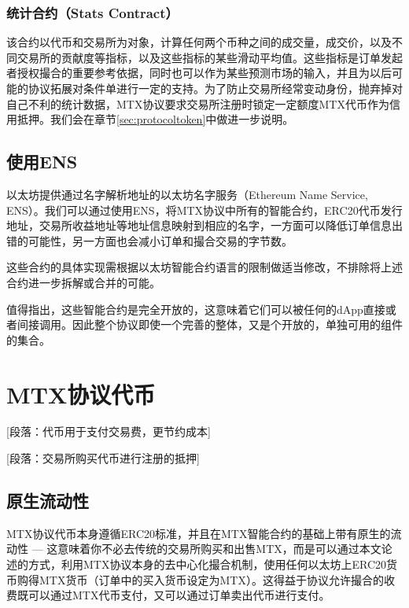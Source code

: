 \documentclass[UTF8,nofonts]{ctexart}
\begin{document}
\subsubsection{统计合约（Stats Contract）} 该合约以代币和交易所为对象，计算任何两个币种之间的成交量，成交价，以及不同交易所的贡献度等指标，以及这些指标的某些滑动平均值。这些指标是订单发起者授权撮合的重要参考依据，同时也可以作为某些预测市场的输入，并且为以后可能的协议拓展对条件单进行一定的支持。为了防止交易所经常变动身份，抛弃掉对自己不利的统计数据，MTX协议要求交易所注册时锁定一定额度MTX代币作为信用抵押。我们会在章节\ref{sec:protocoltoken}中做进一步说明。

\subsection{使用ENS\label{sec:registration}}

以太坊提供通过名字解析地址的以太坊名字服务（Ethereum Name Service, ENS）\cite{hirai2016formal}。我们可以通过使用ENS，将MTX协议中所有的智能合约，ERC20代币发行地址，交易所收益地址等地址信息映射到相应的名字，一方面可以降低订单信息出错的可能性，另一方面也会减小订单和撮合交易的字节数。


这些合约的具体实现需根据以太坊智能合约语言的限制做适当修改，不排除将上述合约进一步拆解或合并的可能。

值得指出，这些智能合约是完全开放的，这意味着它们可以被任何的dApp直接或者间接调用。因此整个协议即使一个完善的整体，又是个开放的，单独可用的组件的集合。

\section{MTX协议代币\label{sec:protocoltoken}}



[段落：代币用于支付交易费，更节约成本]

[段落：交易所购买代币进行注册的抵押]

\subsection{原生流动性}

MTX协议代币本身遵循ERC20标准，并且在MTX智能合约的基础上带有原生的流动性 --- 这意味着你不必去传统的交易所购买和出售MTX，而是可以通过本文论述的方式，利用MTX协议本身的去中心化撮合机制，使用任何以太坊上ERC20货币购得MTX货币（订单中的买入货币设定为MTX）。这得益于协议允许撮合的收费既可以通过MTX代币支付，又可以通过订单卖出代币进行支付。
\end{document}
